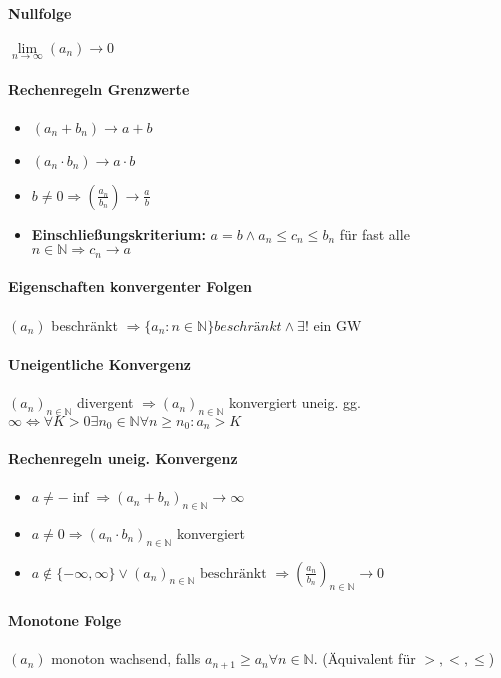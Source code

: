 \documentclass[paper=a4,paper=landscape, fontsize=6pt,DIV=25, twoside]{scrartcl}
\newcommand{\nat}{\mathbb{N}}
\newcommand{\aseq}{(a_n)_{n \in \nat}}
\begin{document}
\begin{multicols*}{4}
		\paragraph{Nullfolge}
		$\lim\limits_{n \rightarrow \infty} (a_n) \rightarrow 0$
		\paragraph{Rechenregeln Grenzwerte}
			\begin{itemize}[noitemsep,nolistsep]
				\item $(a_n+b_n) \rightarrow a+b$
				\item $(a_n \cdot b_n) \rightarrow a \cdot b$
				\item $b \neq 0 \Rightarrow (\frac{a_n}{b_n}) \rightarrow \frac{a}{b}$
				\item \textbf{Einschließungskriterium:} $a=b \wedge a_n \leq c_n \leq b_n$ für fast alle $n \in \nat \Rightarrow c_n \rightarrow a$
			\end{itemize}
		\paragraph{Eigenschaften konvergenter Folgen}
		$(a_n)$ beschränkt $\Rightarrow \{a_n : n \in \nat\} beschränkt \wedge \exists! \text{ ein GW}$
		\paragraph{Uneigentliche Konvergenz}
		$\aseq$ divergent $\Rightarrow\aseq$ konvergiert uneig. gg. $\infty \Leftrightarrow \forall K > 0 \exists n_0 \in \nat \forall n \geq n_0: a_n > K$
		\paragraph{Rechenregeln uneig. Konvergenz}
			\begin{itemize}[noitemsep,nolistsep]
				\item $a \neq -\inf \Rightarrow (a_n+b_n)_{n \in \nat} \rightarrow \infty$
				\item $a \neq 0 \Rightarrow (a_n \cdot b_n)_{n \in \nat}$ konvergiert
				\item $a \notin \{-\infty, \infty\} \vee\aseq \text{ beschränkt } \Rightarrow (\frac{a_n}{b_n})_{n \in \nat} \rightarrow 0$
			\end{itemize}
		\paragraph{Monotone Folge}
			$(a_n)$ monoton wachsend, falls $a_{n+1} \geq a_n \forall n \in \nat$. (Äquivalent für $>,<,\leq$)

\end{multicols*}
\end{document}
